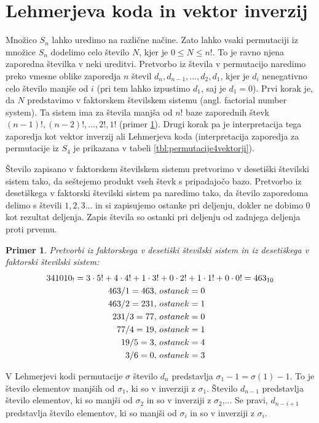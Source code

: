 \documentclass[a4paper, 12pt]{book}
\newtheorem{primer}{Primer}[chapter]
\begin{document}
\section{ Lehmerjeva koda in vektor inverzij}
Množico $S_n$ lahko uredimo na različne načine. Zato lahko vsaki permutaciji iz množice $S_n$ dodelimo celo število $N$, kjer je $0 \leq N \leq n!$. To je ravno njena zaporedna številka v neki ureditvi. Pretvorbo iz števila v permutacijo naredimo preko vmesne oblike zaporedja $n$ števil $d_n,d_{n-1},...,d_2,d_1$, kjer je $d_i$ nenegativno celo število manjše od $i$ (pri tem lahko izpustimo $d_1$, saj je $d_1 = 0$). Prvi korak je, da $N$ predstavimo v faktorskem številskem sistemu (angl. factorial number system). Ta sistem ima za števila manjša od $n!$ baze zaporednih števk $(n-1)!,(n-2)!,...,2!,1!$ (primer \ref{primer_faktorski_stevilski_sistem}). Drugi korak pa je interpretacija tega zaporedja kot vektor inverzij ali Lehmerjeva koda (interpretacija zaporedja za permutacije iz $S_4$ je prikazana v tabeli \ref{tbl:permutacije4vektorji}).

Število zapisano v faktorskem številskem sistemu pretvorimo v desetiški številski sistem tako, da seštejemo produkt vseh števk s pripadajočo bazo. Pretvorbo iz desetiškega v faktorski številski sistem pa naredimo tako, da število zaporedoma delimo s števili $1, 2, 3...$ in si zapisujemo ostanke pri deljenju, dokler ne dobimo $0$ kot rezultat deljenja. Zapis števila so ostanki pri deljenju od zadnjega deljenja proti prvemu. 

\begin{primer}
\label{primer_faktorski_stevilski_sistem}
Pretvorbi iz faktorskega v desetiški številski sistem in iz desetiškega v faktorski številski sistem: 
    \begin{align}
        341010_{!} = 3 \cdot 5! + 4 \cdot 4! + 1 \cdot 3&! + 0 \cdot 2! + 1 \cdot 1! + 0 \cdot 0! = 463_{10} \notag\\
        463 / 1 = 463,&\ ostanek = 0 \notag\\
        463 / 2 = 231,&\ ostanek = 1 \notag\\
        231 / 3 = 77,&\ ostanek = 0 \notag\\
        77 / 4 = 19,&\ ostanek = 1 \notag\\
        19 / 5 = 3,&\ ostanek = 4 \notag\\
        3 / 6 = 0,&\ ostanek = 3 \notag
    \end{align}
\end{primer}

V Lehmerjevi kodi permutacije $\sigma$ število $d_n$ predstavlja $\sigma_1 - 1 = \sigma(1) - 1$. To je število elementov manjših od $\sigma_1$, ki so v inverziji z $\sigma_1$. Število $d_{n-1}$ predstavlja število elementov, ki so manjši od $\sigma_2$ in so v inverziji z $\sigma_2$,... Se pravi, $d_{n-i+1}$ predstavlja število elementov, ki so manjši od $\sigma_i$ in so v inverziji z $\sigma_i$.
\end{document}
